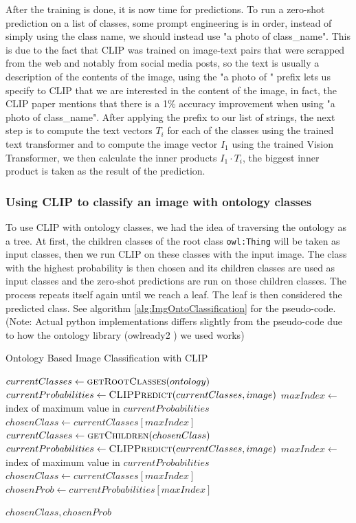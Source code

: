 \documentclass[a4paper,11pt,oneside]{article}
\begin{document}
  After the training is done, it is now time for predictions. To run a zero-shot prediction on a list of classes, some prompt engineering is in order, instead of simply using the class name, we should instead use "a photo of class\_name". This is due to the fact that CLIP was trained on image-text pairs that were scrapped from the web and notably from social media posts, so the text is usually a description of the contents of the image, using the "a photo of " prefix lets us specify to CLIP that we are interested in the content of the image, in fact, the CLIP paper mentions that there is a 1\% accuracy improvement when using "a photo of class\_name". After applying the prefix to our list of strings, the next step is to compute the text vectors $T_i$ for each of the classes using the trained text transformer and to compute the image vector $I_1$ using the trained Vision Transformer, we then calculate the inner products $I_1 \cdot T_i$, the biggest inner product is taken as the result of the prediction.
  \subsubsection{Using CLIP to classify an image with ontology classes}
  To use CLIP with ontology classes, we had the idea of traversing the ontology as a tree. At first, the children classes of the root class \texttt{owl:Thing} will be taken as input classes, then we run CLIP on these classes with the input image. The class with the highest probability is then chosen and its children classes are used as input classes and the zero-shot predictions are run on those children classes. The process repeats itself again until we reach a leaf. The leaf is then considered the predicted class. See algorithm \ref{alg:ImgOntoClassification} for the pseudo-code. (Note: Actual python implementations differs slightly from the pseudo-code due to how the ontology library (owlready2 \cite{owlready2}) we used works)
  	\begin{algorithm}
  		\caption{Ontology Based Image Classification with CLIP}\label{alg:ImgOntoClassification}
  		\begin{algorithmic}
  			\State $currentClasses \gets \Call{getRootClasses}{ontology}$
  			\State $currentProbabilities \gets \Call{CLIPPredict}{currentClasses, image}$
  			\State $maxIndex \gets$ index of maximum value in $currentProbabilities$
  			\State $chosenClass \gets currentClasses[maxIndex]$
  				\State $currentClasses \gets \Call{getChildren}{chosenClass}$
  				\State $currentProbabilities \gets \Call{CLIPPredict}{currentClasses, image}$
  				\State $maxIndex \gets$ index of maximum value in $currentProbabilities$
  				\State $chosenClass \gets currentClasses[maxIndex]$
  				\State $chosenProb \gets currentProbabilities[maxIndex]$
  			\EndWhile
  			
  			\State \Return $chosenClass, chosenProb$
  			\EndFunction
  		\end{algorithmic}
  	\end{algorithm}
  	
\end{document}
